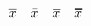 \documentclass{article}
\newcommand*{\negbool}[2][0.4pt]{\ensuremath{\accentset{\rule{\widthof{#2}}{#1}}{#2}}}
\begin{document}
$\overline{x} \quad \bar{x} \quad \negbool{x} \quad \negbool[1pt]{x}$
\end{document}
